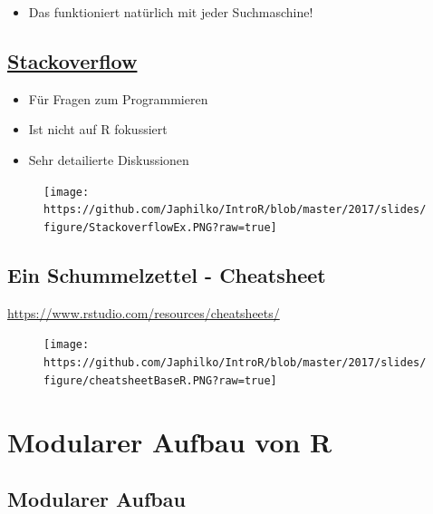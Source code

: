 \documentclass[]{article}
\providecommand{\tightlist}{%
  \setlength{\itemsep}{0pt}\setlength{\parskip}{0pt}}
\begin{document}
\begin{itemize}
\tightlist
\item
  Das funktioniert natürlich mit jeder Suchmaschine!
\end{itemize}

\subsection{\texorpdfstring{\href{http://stackoverflow.com/}{Stackoverflow}}{Stackoverflow}}\label{stackoverflow}

\begin{itemize}
\tightlist
\item
  Für Fragen zum Programmieren
\item
  Ist nicht auf R fokussiert
\item
  Sehr detailierte Diskussionen
\end{itemize}

\begin{figure}[htbp]
\centering
\texttt{[image: https://github.com/Japhilko/IntroR/blob/master/2017/slides/figure/StackoverflowEx.PNG?raw=true]}
\caption{}
\end{figure}

\subsection{Ein Schummelzettel -
Cheatsheet}\label{ein-schummelzettel---cheatsheet}

\url{https://www.rstudio.com/resources/cheatsheets/}

\begin{figure}[htbp]
\centering
\texttt{[image: https://github.com/Japhilko/IntroR/blob/master/2017/slides/figure/cheatsheetBaseR.PNG?raw=true]}
\caption{}
\end{figure}

\section{Modularer Aufbau von R}\label{modularer-aufbau-von-r}

\subsection{Modularer Aufbau}\label{modularer-aufbau}
\end{document}
